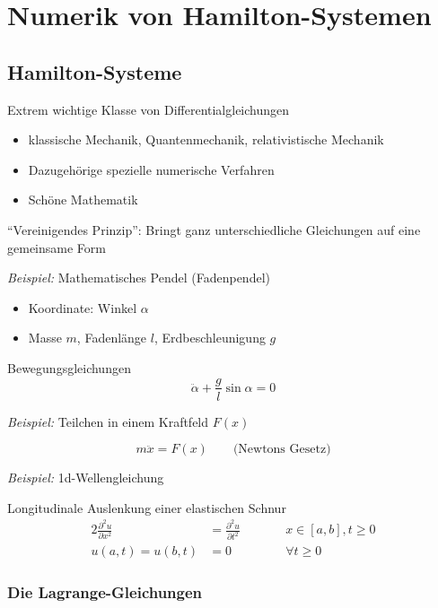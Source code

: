 \chapter{Numerik von Hamilton-Systemen}

\section{Hamilton-Systeme}

Extrem wichtige Klasse von Differentialgleichungen
\begin{itemize}
\item klassische Mechanik, Quantenmechanik, relativistische Mechanik
\item Dazugehörige spezielle numerische Verfahren
\item Schöne Mathematik
\end{itemize}

``Vereinigendes Prinzip'': Bringt ganz unterschiedliche Gleichungen auf eine gemeinsame Form

\emph{Beispiel:} Mathematisches Pendel (Fadenpendel)

\begin{itemize}
\item Koordinate: Winkel $\alpha$
\item Masse $m$, Fadenlänge $l$, Erdbeschleunigung $g$
\end{itemize}
Bewegungsgleichungen
\begin{equation*}
  \ddot \alpha + \frac{g}{l} \sin \alpha = 0
\end{equation*}

\emph{Beispiel:} Teilchen in einem Kraftfeld $F(x)$

\begin{equation*}
  m \ddot x = F(x) \qquad \text{(Newtons Gesetz)}
\end{equation*}

\emph{Beispiel:} 1d-Wellengleichung

Longitudinale Auslenkung einer elastischen Schnur
\begin{alignat*}{2}
  \frac{\partial^2 u}{\partial x^2} & = \frac{\partial^2 u}{\partial t^2} & \qquad & x \in [a, b], t \ge 0 \\
  u(a, t) = u(b, t) & = 0 && \forall t \ge 0
\end{alignat*}

\subsection{Die Lagrange-Gleichungen}
\label{sec:lagrange_gleichung}

